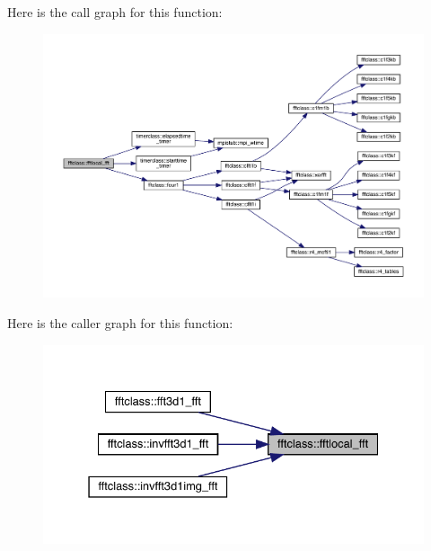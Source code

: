 Here is the call graph for this function\+:\nopagebreak
\begin{figure}[H]
\begin{center}
\leavevmode
\includegraphics[width=350pt]{namespacefftclass_aa64d94b8c8578b384955207a409a2445_cgraph}
\end{center}
\end{figure}
Here is the caller graph for this function\+:\nopagebreak
\begin{figure}[H]
\begin{center}
\leavevmode
\includegraphics[width=331pt]{namespacefftclass_aa64d94b8c8578b384955207a409a2445_icgraph}
\end{center}
\end{figure}
\mbox{\label{namespacefftclass_af33a24fc1bf4d5763c335c0cef247e3c}} 
